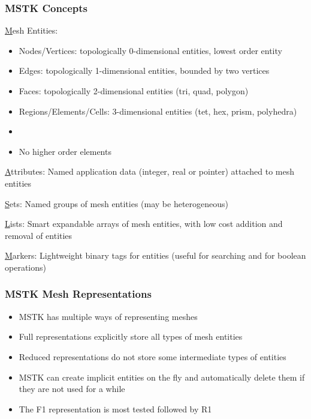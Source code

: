 \documentclass{beamer}
\begin{document}
\begin{frame}
\frametitle{MSTK Concepts}

{\underline Mesh Entities:}

\begin{itemize}
\item Nodes/Vertices: topologically 0-dimensional entities, lowest order entity
\item Edges: topologically 1-dimensional entities, bounded by two vertices
\item Faces: topologically 2-dimensional entities (tri, quad, polygon)
\item Regions/Elements/Cells: 3-dimensional entities (tet, hex, prism, polyhedra)
\item[]
\item No higher order elements 
\end{itemize}

{\underline Attributes}: Named application data (integer, real or
pointer) attached to mesh entities

{\underline Sets}: Named groups of mesh entities (may be heterogeneous)

{\underline Lists}: Smart expandable arrays of mesh entities, with low
cost addition and removal of entities

{\underline Markers}: Lightweight binary tags for entities (useful for
searching and for boolean operations)

\end{frame}

\begin{frame}
\frametitle{MSTK Mesh Representations}

\begin{itemize}
\item MSTK has multiple ways of representing meshes
\item Full representations explicitly store all types of mesh entities
\item Reduced representations do not store some intermediate types of entities
\item MSTK can create implicit entities on the fly and automatically
  delete them if they are not used for a while
\item The F1 representation is most tested followed by R1
\end{itemize}
\end{frame}
\end{document}
